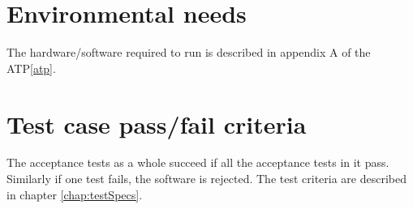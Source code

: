 \section{Environmental needs}
The hardware/software required to run \applicationname{} is described in appendix A of the ATP\ref{atp}.

\section{Test case pass/fail criteria}
The acceptance tests as a whole succeed if all the acceptance tests in it pass. Similarly if one test fails, the software is rejected.
The test criteria are described in chapter \ref{chap:testSpecs}.